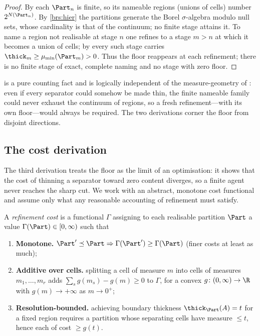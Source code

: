 \begin{proof}
By  each $\Part_n$ is finite, so its nameable regions
(unions of cells) number $2^{N(\Part_n)}$. By \ref{brs:hier} the partitions
generate the Borel $\sigma$-algebra modulo null sets, whose cardinality is that
of the continuum; no finite stage attains it. To name a region not realisable at
stage $n$ one refines to a stage $m>n$ at which it becomes a union of cells; by
 every such stage carries $\thick_m\ge\mu_{\min}(\Part_m)>0$.
Thus the floor reappears at each refinement; there is no finite stage of exact,
complete naming and no stage with zero floor.
\end{proof}

\begin{remark}
 is a pure counting fact and is logically independent of the
measure-geometry of : even if every separator could somehow
be made thin, the finite nameable family could never exhaust the continuum of
regions, so a fresh refinement---with its own floor---would always be required.
The two derivations corner the floor from disjoint directions.
\end{remark}

\subsection{The cost derivation}

The third derivation treats the floor as the limit of an optimisation: it shows
that the cost of thinning a separator toward zero content diverges, so a finite
agent never reaches the sharp cut. We work with an abstract, monotone cost
functional and assume only what any reasonable accounting of refinement must
satisfy.

\begin{definition}
\label{def:cost}
A \emph{refinement cost} is a functional $\Gamma$ assigning to each realisable
partition $\Part$ a value $\Gamma(\Part)\in[0,\infty)$ such that
\begin{enumerate}[label=\textup{(C\arabic*)},leftmargin=3em]
\item\label{c:mono} \textbf{Monotone.} $\Part'\preceq\Part\Rightarrow
\Gamma(\Part')\ge\Gamma(\Part)$ \textup{(}finer costs at least as much\textup{)};
\item\label{c:additive} \textbf{Additive over cells.} splitting a cell of
measure $m$ into cells of measures $m_1,\dots,m_r$ adds
$\sum_s g(m_s)-g(m)\ge0$ to $\Gamma$, for a convex $g\colon(0,\infty)\to\R$
with $g(m)\to+\infty$ as $m\to0^+$;
\item\label{c:reso} \textbf{Resolution-bounded.} achieving boundary thickness
$\thick_\Part(A)=t$ for a fixed region requires a partition whose separating
cells have measure $\le t$, hence each of cost $\ge g(t)$.
\end{enumerate}
\end{definition}

